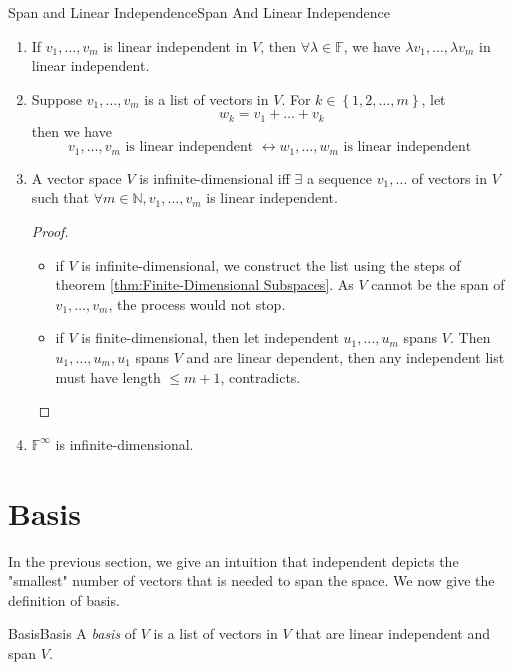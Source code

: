 \documentclass[../main.tex]{subfiles}
\begin{document}
\begin{example}{Span and Linear Independence}{Span And Linear Independence}
\begin{enumerate}
	\item If $v_1, \ldots ,v_m$ is linear independent in $V$, then $\forall \lambda \in \mathbb{F}$, we have $\lambda v_1, \ldots ,\lambda v_m$ in linear independent.
	\item Suppose $v_1, \ldots ,v_m$ is a list of vectors in $V$. For $k \in \left\{ 1,2, \ldots ,m \right\}$, let
		\begin{equation*}
		w_k = v_1+\ldots +v_k
		\end{equation*}
		then we have 
		\begin{equation*}
		v_1, \ldots ,v_m \text{ is linear independent } \leftrightarrow w_1, \ldots ,w_m \text{ is linear independent }
		\end{equation*}
	\item A vector space $V$ is infinite-dimensional iff $\exists $ a sequence $v_1, \ldots $ of vectors in $V$ such that $\forall m \in \mathbb{N}, v_1, \ldots ,v_m$ is linear independent.

		\begin{proof}\par
		\begin{itemize}
			\item if $V$ is infinite-dimensional, we construct the list using the steps of theorem \ref{thm:Finite-Dimensional Subspaces}. As $V$ cannot be the span of $v_1, \ldots ,v_m$, the process would not stop.
			\item if $V$ is finite-dimensional, then let independent $u_1, \ldots ,u_m$ spans $V$. Then $u_1, \ldots ,u_m,u_1$ spans $V$ and are linear dependent, then any independent list must have length $\leq m+1$, contradicts.
		\end{itemize}
		\end{proof}

	\item $\mathbb{F}^{\infty}$ is infinite-dimensional.
\end{enumerate}
\end{example}


\section{Basis}

In the previous section, we give an intuition that independent depicts the "smallest" number of vectors that is needed to span the space. We now give the definition of basis.
\begin{definition}{Basis}{Basis}
	A \emph{basis} of $V$ is a list of vectors in $V$ that are linear independent and span $V$.
\end{definition}
\end{document}
